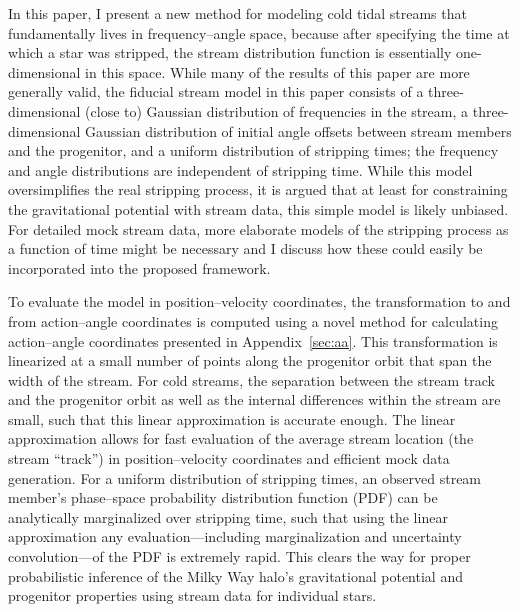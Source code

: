 \documentclass[12pt,preprint]{aastex}
\begin{document}
In this paper, I present a new method for modeling cold tidal streams
that fundamentally lives in frequency--angle space, because after
specifying the time at which a star was stripped, the stream
distribution function is essentially one-dimensional in this
space. While many of the results of this paper are more generally
valid, the fiducial stream model in this paper consists of a
three-dimensional (close to) Gaussian distribution of frequencies in
the stream, a three-dimensional Gaussian distribution of initial angle
offsets between stream members and the progenitor, and a uniform
distribution of stripping times; the frequency and angle distributions
are independent of stripping time. While this model oversimplifies the
real stripping process, it is argued that at least for constraining
the gravitational potential with stream data, this simple model is
likely unbiased. For detailed mock stream data, more elaborate models
of the stripping process as a function of time might be necessary and
I discuss how these could easily be incorporated into the proposed
framework.

To evaluate the model in position--velocity coordinates, the
transformation to and from action--angle coordinates is computed using
a novel method for calculating action--angle coordinates presented in
Appendix~\ref{sec:aa}. This transformation is linearized at a small
number of points along the progenitor orbit that span the width of the
stream. For cold streams, the separation between the stream track and
the progenitor orbit as well as the internal differences within the
stream are small, such that this linear approximation is accurate
enough. The linear approximation allows for fast evaluation of the
average stream location (the stream ``track'') in position--velocity
coordinates and efficient mock data generation. For a uniform
distribution of stripping times, an observed stream member's
phase--space probability distribution function (PDF) can be
analytically marginalized over stripping time, such that using the
linear approximation any evaluation---including marginalization and
uncertainty convolution---of the PDF is extremely rapid. This clears
the way for proper probabilistic inference of the Milky Way halo's
gravitational potential and progenitor properties using stream data
for individual stars.
\end{document}
